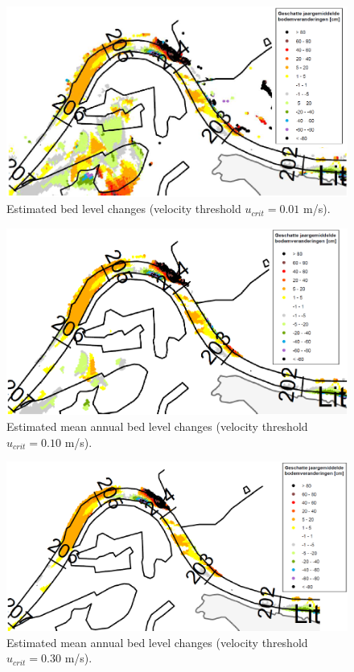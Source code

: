 \begin{figure}
\center
\includegraphics[width=12cm]{figures/Fig14a.png}
\caption{Estimated bed level changes (velocity threshold $u_{crit} = 0.01$ m/s).}
\label{App.Fig14a}
\end{figure}

\begin{figure}
\center
\includegraphics[width=12cm]{figures/Fig14b.png}
\caption{Estimated mean annual bed level changes (velocity threshold $u_{crit} = 0.10$ m/s).}
\label{App.Fig14b}
\end{figure}

\begin{figure}
\center
\includegraphics[width=12cm]{figures/Fig14c.png}
\caption{Estimated mean annual bed level changes (velocity threshold $u_{crit} = 0.30$ m/s).}
\label{App.Fig14c}
\end{figure}

